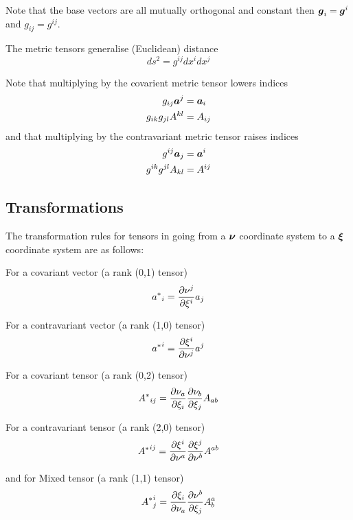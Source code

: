 Note that the base vectors are all mutually orthogonal and constant then
$\vect{g}_{i}=\vect{g}^{i}$ and $g_{ij}=g^{ij}$.

The metric tensors generalise (Euclidean) distance \ie
\begin{equation}
  ds^{2}=g^{ij}dx^{i}dx^{j}
\end{equation}

Note that multiplying by the covarient metric tensor lowers indices \ie
\begin{align}
  g_{ij}\vect{A}^{j} &= \vect{A}_{i} \\
  g_{ik}g_{jl}A^{kl} &= A_{ij}
\end{align}
and that multiplying by the contravariant metric tensor raises indices \ie
\begin{align}
  g^{ij}\vect{A}_{j} &= \vect{A}^{i} \\
  g^{ik}g^{jl}A_{kl} &= A^{ij}
\end{align}

\subsection{Transformations}

The transformation rules for tensors in going from a $\vect{\nu}$ coordinate
system to a $\vect{\xi}$ coordinate system are as follows: 


For a covariant vector (a rank (0,1) tensor)
\begin{equation}
  {a^{*}}_{i}= \dfrac{\partial \nu^{j}}{\partial \xi^{i}} a_{j}
\end{equation}

For a contravariant vector (a rank (1,0) tensor)
\begin{equation}
  {a^{*}}^{i}= \dfrac{\partial \xi^{i}}{\partial \nu^{j}} a^{j}
\end{equation}

For a covariant tensor (a rank (0,2) tensor)
\begin{equation}
  {A^{*}}_{ij}= \dfrac{\partial \nu_{a}}{\partial \xi_{i}}  \dfrac{\partial \nu_{b}}{\partial \xi_{j}} A_{ab} 
\end{equation}

For a contravariant tensor (a rank (2,0) tensor)
\begin{equation}
  {A^{*}}^{ij}= \dfrac{\partial \xi^{i}}{\partial \nu^{a}}  \dfrac{\partial \xi^{j}}{\partial \nu^{b}} A^{ab}
\end{equation}

and for Mixed tensor (a rank (1,1) tensor)
\begin{equation}
  {A^{*}}^{i}_{j}= \dfrac{\partial \xi_{i}}{\partial \nu_{a}}  \dfrac{\partial \nu^{b}}{\partial \xi_{j}} A^{a}_{b}
\end{equation}

